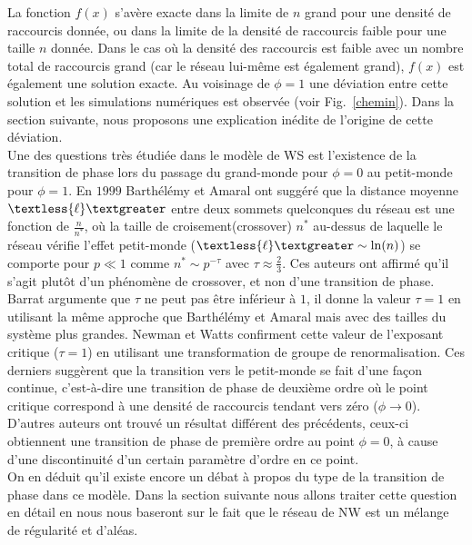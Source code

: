 La fonction $f(x)$ s'avère exacte dans la limite de $n$ grand pour une densité de raccourcis donnée, ou dans la limite de la densité de raccourcis faible pour une taille $n$ donnée. Dans le cas où la densité des raccourcis est faible avec un nombre total de raccourcis grand (car le réseau lui-même est également grand), $f(x)$ est également une solution exacte. Au voisinage de $\phi=1$ une déviation entre cette solution  et les simulations numériques est observée (voir Fig.~\ref{chemin}). Dans la section suivante, nous proposons une explication inédite de l'origine de cette déviation.\\
Une des questions très étudiée dans le modèle de WS est l'existence de la transition de phase lors du passage du grand-monde pour $\phi=0$ au petit-monde pour $\phi=1$. 
En $1999$ Barthélémy et Amaral \cite{Barthelemy-Amaral1999} ont suggéré que la distance moyenne $\textless {\ell} \textgreater$ entre deux sommets quelconques du réseau est une fonction de $\frac{n}{n^*}$, où la taille de croisement(crossover) $n^*$ au-dessus de laquelle le réseau vérifie l'effet petit-monde ($\textless {\ell} \textgreater\sim \ln(n)$) se comporte pour $p\ll1$ comme $n^*\sim p^{-\tau}$ avec $\tau \approx \frac{2}{3}$. Ces auteurs ont affirmé qu'il s'agit plutôt d'un phénomène de crossover, et non d'une transition de phase. Barrat \cite{Barrat} argumente que $\tau$ ne peut pas être inférieur à $1$, il donne la  valeur $\tau=1$ en utilisant la m\^{e}me approche que Barthélémy et Amaral mais avec des tailles du système plus grandes. Newman et Watts \cite{Newman-Watts1999-2,Newman-Watts1999-3} confirment cette valeur de l'exposant critique  ($\tau=1$) en utilisant une transformation de groupe de renormalisation. Ces derniers suggèrent que la transition vers le petit-monde se fait d'une façon continue, c'est-à-dire une transition de phase de deuxième ordre où le point critique correspond à une densité de raccourcis tendant vers zéro ($\phi \rightarrow 0$). D'autres auteurs \cite{Argollo-al2000} ont trouvé un résultat différent des précédents, ceux-ci obtiennent une transition de phase de première ordre au point $\phi=0$, à cause d'une discontinuité d'un certain paramètre d'ordre en ce point. \\
On en déduit qu'il existe encore un débat à propos du type de la transition de phase dans ce modèle. Dans la section suivante nous allons traiter cette question en détail en nous nous baseront sur le fait que le réseau de NW est un mélange de régularité et d'aléas.
